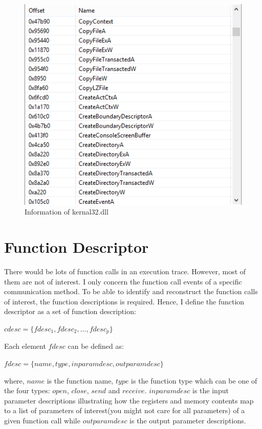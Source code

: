 \begin{figure}[H]
\centerline{\includegraphics[scale=0.6]{Figures/executable}}
\caption{Information of kernal32.dll}
\label{executable}
\end{figure}

\section{Function Descriptor}\label{cdesc}
There would be lots of function calls in an execution trace. However, most of them are not of interest. I only concern the function call events of a specific communication method. To be able to identify and reconstruct the function calls of interest, the function descriptions is required. Hence, I define the function descriptor as a set of function description:

$cdesc = \lbrace fdesc_1, fdesc_2,...,fdesc_p \rbrace$

Each element $fdesc$ can be defined as:

$fdesc = \lbrace name, type, inparamdesc, outparamdesc \rbrace$

where, $name$ is the function name, $type$ is the function type which can be one of the four types: $open$, $close$, $send$ and $receive$. $inparamdesc$ is the input parameter descriptions illustrating how the registers and memory contents map to a list of parameters of interest(you might not care for all parameters) of a given function call while $outparamdesc$ is the output parameter descriptions. 


